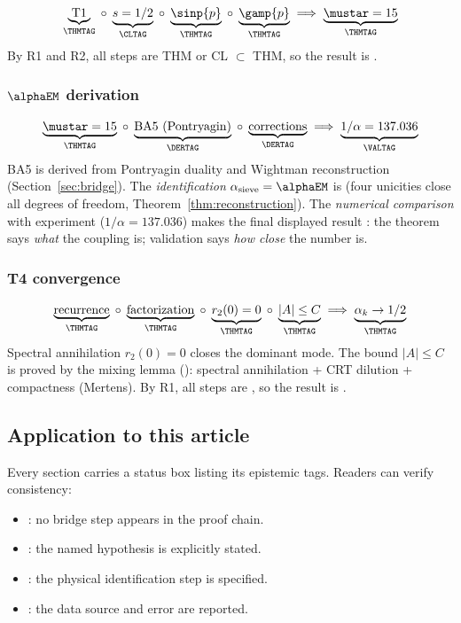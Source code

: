 \documentclass[12pt,a4paper]{article}
\begin{document}
\[
  \underbrace{\text{T1}}_{\THMTAG} \;\circ\;
  \underbrace{s = 1/2}_{\CLTAG} \;\circ\;
  \underbrace{\sinp{p}}_{\THMTAG} \;\circ\;
  \underbrace{\gamp{p}}_{\THMTAG}
  \;\Longrightarrow\; \underbrace{\mustar = 15}_{\THMTAG}
\]
By R1 and R2, all steps are THM or CL $\subset$ THM,
so the result is \THMTAG.

\subsubsection{$\alphaEM$ derivation}

\[
  \underbrace{\mustar = 15}_{\THMTAG} \;\circ\;
  \underbrace{\text{BA5 (Pontryagin)}}_{\DERTAG} \;\circ\;
  \underbrace{\text{corrections}}_{\DERTAG}
  \;\Longrightarrow\; \underbrace{1/\alpha = 137.036}_{\VALTAG}
\]
BA5 is derived from Pontryagin duality and Wightman
reconstruction (Section~\ref{sec:bridge}). The \emph{identification}
$\alpha_{\rm sieve} = \alphaEM$ is \THMTAG{} (four unicities
close all degrees of freedom, Theorem~\ref{thm:reconstruction}).
The \emph{numerical comparison} with experiment ($1/\alpha = 137.036$)
makes the final displayed result \VALTAG: the theorem says
\emph{what} the coupling is; validation says \emph{how close}
the number is.

\subsubsection{T4 convergence}

\[
  \underbrace{\text{recurrence}}_{\THMTAG} \;\circ\;
  \underbrace{\text{factorization}}_{\THMTAG} \;\circ\;
  \underbrace{r_2(0) = 0}_{\THMTAG} \;\circ\;
  \underbrace{|A| \leq C}_{\THMTAG}
  \;\Longrightarrow\; \underbrace{\alpha_k \to 1/2}_{\THMTAG}
\]
Spectral annihilation $r_2(0) = 0$ closes the dominant mode.
The bound $|A| \leq C$ is proved by the mixing lemma
(\cite{companion_M3}): spectral annihilation
+ CRT dilution + compactness (Mertens).
By R1, all steps are \THMTAG, so the result is \THMTAG.

\subsection{Application to this article}
\label{sec:app_d_application}

Every section carries a status box listing its epistemic tags.
Readers can verify consistency:
\begin{itemize}[nosep]
\item \THMTAG: no bridge step appears in the proof chain.
\item \CONDTAG: the named hypothesis is explicitly stated.
\item \BRIDGETAG: the physical identification step is specified.
\item \VALTAG: the data source and error are reported.
\end{itemize}
\end{document}

